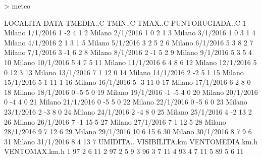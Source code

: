 \documentclass[onecolumn,12pt]{book}
\begin{document}
\begin{Schunk}
\begin{Sinput}
> meteo
\end{Sinput}
\begin{Soutput}
   LOCALITA      DATA TMEDIA..C TMIN..C TMAX..C PUNTORUGIADA..C
1    Milano  1/1/2016         1      -2       4               1
2    Milano  2/1/2016         1       0       2               1
3    Milano  3/1/2016         1       0       3               1
4    Milano  4/1/2016         2       1       3               1
5    Milano  5/1/2016         3       2       5               2
6    Milano  6/1/2016         5       3       8               2
7    Milano  7/1/2016         3      -1       6               2
8    Milano  8/1/2016         2      -1       5               2
9    Milano  9/1/2016         5       3       5               4
10   Milano 10/1/2016         5       4       7               5
11   Milano 11/1/2016         6       4       8               6
12   Milano 12/1/2016         5       0      12               3
13   Milano 13/1/2016         7       1      12               0
14   Milano 14/1/2016         2      -2       5               1
15   Milano 15/1/2016         5       1      11               1
16   Milano 16/1/2016         5      -3      11               0
17   Milano 17/1/2016         6       2       8               0
18   Milano 18/1/2016         0      -5       5               0
19   Milano 19/1/2016        -1      -5       4               0
20   Milano 20/1/2016         0      -4       4               0
21   Milano 21/1/2016         0      -5       5               0
22   Milano 22/1/2016         0      -5       6               0
23   Milano 23/1/2016         2      -3       8               0
24   Milano 24/1/2016         2      -4       8               0
25   Milano 25/1/2016         4      -2      13               2
26   Milano 26/1/2016         7      -1      15               5
27   Milano 27/1/2016         7       1      12               5
28   Milano 28/1/2016         9       7      12               6
29   Milano 29/1/2016        10       6      15               6
30   Milano 30/1/2016         8       7       9               6
31   Milano 31/1/2016         8       4      13               7
   UMIDITA.. VISIBILITA.km VENTOMEDIA.km.h VENTOMAX.km.h
1         97             2               6            11
2         97             2               5             9
3         96             3               7            11
4         93             4               7            11
5         89             5               6            11

\end{Soutput}
\end{Schunk}
\end{document}
